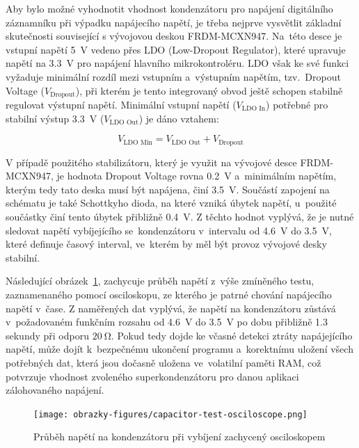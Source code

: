 \newpage

Aby bylo možné vyhodnotit vhodnost kondenzátoru pro napájení digitálního záznamníku při výpadku napájecího napětí, je třeba nejprve vysvětlit základní skutečnosti související s vývojovou deskou FRDM-MCXN947. Na~této desce je vstupní napětí \SI{5}{\volt} vedeno přes LDO (Low-Dropout Regulator), které upravuje napětí na \SI{3.3}{\volt} pro napájení hlavního mikrokontroléru. LDO však ke své funkci vyžaduje minimální rozdíl mezi vstupním a~výstupním napětím, tzv.~Dropout Voltage ($V_{\text{Dropout}}$), při kterém je tento integrovaný obvod ještě schopen stabilně regulovat výstupní napětí. Minimální vstupní napětí ($V_{\text{LDO In}}$) potřebné pro stabilní výstup \SI{3.3}{\volt} ($V_{\text{LDO Out}}$) je dáno vztahem:

\[
V_{\text{LDO Min}} = V_{\text{LDO Out}} + V_{\text{Dropout}}
\]

V případě použitého stabilizátoru, který je využit na vývojové desce FRDM-MCXN947, je hodnota Dropout Voltage rovna \SI{0.2}{\volt} a~minimálním napětím, kterým tedy tato deska musí být napájena, činí \SI{3.5}{\volt}. Součástí zapojení na schématu je také Schottkyho dioda, na které vzniká úbytek napětí, u~použité součástky činí tento úbytek přibližně \SI{0.4}{\volt}. Z těchto hodnot vyplývá, že je nutné sledovat napětí vybíjejícího se~kondenzátoru v~intervalu od \SI{4.6}{\volt} do \SI{3.5}{\volt}, které definuje časový interval, ve~kterém by měl být provoz vývojové desky stabilní.

Následující obrázek~\ref{fig:test-capacitors-osciloscope}, zachycuje průběh napětí z~výše zmíněného testu, zaznamenaného pomocí osciloskopu, ze kterého je patrné chování napájecího napětí v~čase. Z naměřených dat vyplývá, že napětí na kondenzátoru zůstává v~požadovaném funkčním rozsahu od \SI{4.6}{\volt} do \SI{3.5}{\volt} po dobu přibližně 1.3 sekundy při odporu $\SI{20}{\ohm}$. Pokud tedy dojde ke včasné detekci ztráty napájejícího napětí, může dojít k~bezpečnému ukončení programu a~korektnímu uložení všech potřebných dat, která jsou dočasně uložena ve~volatilní paměti RAM, což potvrzuje vhodnost zvoleného superkondenzátoru pro danou aplikaci zálohovaného napájení.

\begin{figure}[h]
    \centering
    \texttt{[image: obrazky-figures/capacitor-test-osciloscope.png]}
    
    \caption{Průběh napětí na kondenzátoru při vybíjení zachycený osciloskopem}
    \label{fig:test-capacitors-osciloscope}
\end{figure}


